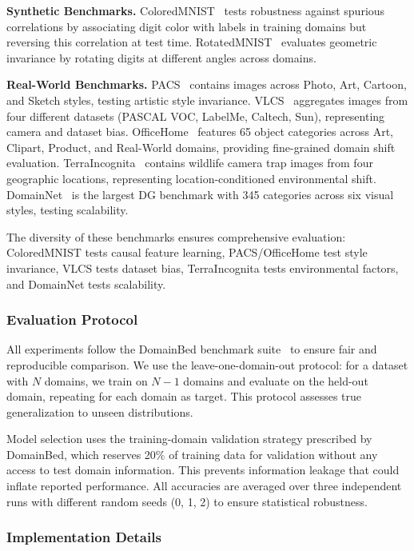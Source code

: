 \textbf{Synthetic Benchmarks.} ColoredMNIST~\citep{arjovsky2019invariant} tests robustness against spurious correlations by associating digit color with labels in training domains but reversing this correlation at test time. RotatedMNIST~\citep{ghifary2015domain} evaluates geometric invariance by rotating digits at different angles across domains.

\textbf{Real-World Benchmarks.} PACS~\citep{li2017deeper} contains images across Photo, Art, Cartoon, and Sketch styles, testing artistic style invariance. VLCS~\citep{fang2013unbiased} aggregates images from four different datasets (PASCAL VOC, LabelMe, Caltech, Sun), representing camera and dataset bias. OfficeHome~\citep{venkateswara2017deep} features 65 object categories across Art, Clipart, Product, and Real-World domains, providing fine-grained domain shift evaluation. TerraIncognita~\citep{beery2018recognition} contains wildlife camera trap images from four geographic locations, representing location-conditioned environmental shift. DomainNet~\citep{peng2019moment} is the largest DG benchmark with 345 categories across six visual styles, testing scalability.

The diversity of these benchmarks ensures comprehensive evaluation: ColoredMNIST tests causal feature learning, PACS/OfficeHome test style invariance, VLCS tests dataset bias, TerraIncognita tests environmental factors, and DomainNet tests scalability.

\subsubsection{Evaluation Protocol}

All experiments follow the DomainBed benchmark suite~\citep{gulrajani2020search} to ensure fair and reproducible comparison. We use the leave-one-domain-out protocol: for a dataset with $N$ domains, we train on $N-1$ domains and evaluate on the held-out domain, repeating for each domain as target. This protocol assesses true generalization to unseen distributions.

Model selection uses the training-domain validation strategy prescribed by DomainBed, which reserves 20\% of training data for validation without any access to test domain information. This prevents information leakage that could inflate reported performance. All accuracies are averaged over three independent runs with different random seeds (0, 1, 2) to ensure statistical robustness.

\subsubsection{Implementation Details}

